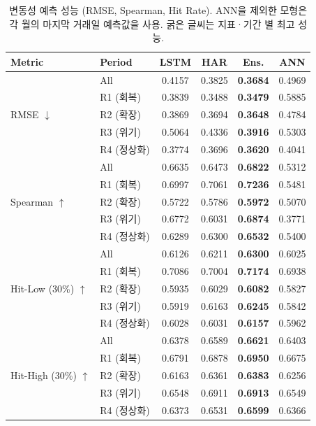 \documentclass[eng]{kjas3}
\begin{document}
\begin{table}[t]
\centering
\caption{변동성 예측 성능 (RMSE, Spearman, Hit Rate). ANN을 제외한 모형은 각 월의 마지막 거래일 예측값을 사용. 굵은 글씨는 지표·기간 별 최고 성능.}
\label{tab:sigma_pred}
\setlength{\tabcolsep}{6pt}
\renewcommand{\arraystretch}{1.15}
\begin{tabular}{ll cccc}
\toprule
Metric & Period & LSTM & HAR & Ens. & ANN \\
\midrule
\multirow{5}{*}{RMSE $\downarrow$}
 & All       & 0.4157 & 0.3825 & \textbf{0.3684} & 0.4969 \\
 & R1 (회복)   & 0.3839 & 0.3488 & \textbf{0.3479} & 0.5885 \\
 & R2 (확장)   & 0.3869 & 0.3694 & \textbf{0.3648} & 0.4784 \\
 & R3 (위기)   & 0.5064 & 0.4336 & \textbf{0.3916} & 0.5303 \\
 & R4 (정상화) & 0.3774 & 0.3696 & \textbf{0.3620} & 0.4041 \\
\midrule
\multirow{5}{*}{Spearman $\uparrow$}
 & All       & 0.6635 & 0.6473 & \textbf{0.6822} & 0.5312 \\
 & R1 (회복)   & 0.6997 & 0.7061 & \textbf{0.7236} & 0.5481 \\
 & R2 (확장)   & 0.5722 & 0.5786 & \textbf{0.5972} & 0.5070 \\
 & R3 (위기)   & 0.6772 & 0.6031 & \textbf{0.6874} & 0.3771 \\
 & R4 (정상화) & 0.6289 & 0.6300 & \textbf{0.6532} & 0.5400 \\
\midrule
\multirow{5}{*}{Hit-Low (30\%) $\uparrow$}
 & All       & 0.6126 & 0.6211 & \textbf{0.6300} & 0.6025 \\
 & R1 (회복)   & 0.7086 & 0.7004 & \textbf{0.7174} & 0.6938 \\
 & R2 (확장)   & 0.5935 & 0.6029 & \textbf{0.6082} & 0.5827 \\
 & R3 (위기)   & 0.5919 & 0.6163 & \textbf{0.6245} & 0.5842 \\
 & R4 (정상화) & 0.6028 & 0.6031 & \textbf{0.6157} & 0.5962 \\
\midrule
\multirow{5}{*}{Hit-High (30\%) $\uparrow$}
 & All       & 0.6378 & 0.6589 & \textbf{0.6621} & 0.6403 \\
 & R1 (회복)   & 0.6791 & 0.6878 & \textbf{0.6950} & 0.6675 \\
 & R2 (확장)   & 0.6163 & 0.6361 & \textbf{0.6383} & 0.6256 \\
 & R3 (위기)   & 0.6548 & 0.6911 & \textbf{0.6913} & 0.6549 \\
 & R4 (정상화) & 0.6373 & 0.6531 & \textbf{0.6599} & 0.6366 \\
\bottomrule
\end{tabular}
\end{table}
\end{document}

